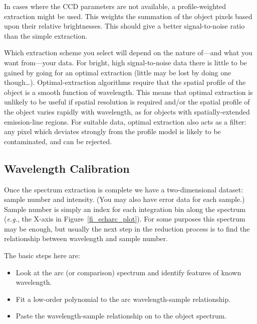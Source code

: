 \documentclass[twoside,11pt]{starlink}
\providecommand{\mlabel}[1]{\xlabel{#1}\label{#1}}
\providecommand{\scspec}[2]{#1}
\begin{document}
In cases where the CCD parameters are not available, a profile-weighted
extraction might be used.  This weights the summation of the
object pixels based upon their relative brightnesses.
This should give a better signal-to-noise ratio than the simple
extraction.

Which extraction scheme you select will depend on the nature
of\scspec{---}{ - }and what you want from\scspec{---}{ - }your data.
For bright, high signal-to-noise data there is little to be gained
by going for an optimal extraction (little may be lost by doing one
though\ldots ).
Optimal-extraction algorithms require that the spatial profile of the
object is a smooth function of wavelength.
This means that optimal extraction is unlikely to be useful if spatial
resolution is required and/or the spatial profile of the object varies
rapidly with wavelength, as for objects with spatially-extended
emission-line regions.  For suitable data, optimal extraction also acts
as a  filter: any pixel which deviates
strongly from the profile model is likely to be contaminated, and can be
rejected.


\subsection{\mlabel{wavelength_calibration}Wavelength Calibration}

Once the spectrum extraction is complete we have a two-dimensional
dataset: sample number and intensity.
(You may also have error data for each sample.)
Sample number is simply an index for each integration bin along the
spectrum ({\em{e.g.}}, the X-axis in \scspec{Figure~\ref{fi_echarc_plot}}
{the figure below}).
For some purposes this spectrum may be enough, but usually
the next step in the reduction process is to find the
relationship between wavelength and sample number.

The basic steps here are:

\begin{itemize}

\item Look at the arc (or comparison) spectrum and identify
      features of known wavelength.

\item Fit a low-order polynomial to the arc wavelength-sample relationship.

\item Paste the wavelength-sample relationship on to the object spectrum.

\end{itemize}
\end{document}
